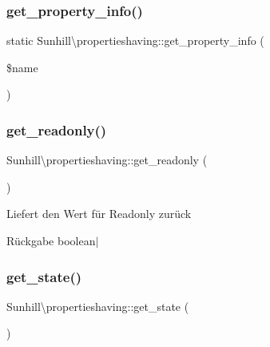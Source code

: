 \subsubsection{\texorpdfstring{get\+\_\+property\+\_\+info()}{get\_property\_info()}}
{\footnotesize\ttfamily static Sunhill\textbackslash{}propertieshaving\+::get\+\_\+property\+\_\+info (\begin{DoxyParamCaption}\item[{}]{\$name }\end{DoxyParamCaption})\hspace{0.3cm}{\ttfamily [static]}}

\mbox{\label{classSunhill_1_1propertieshaving_af24837011f4842790e4c3af28b000893}} 
\subsubsection{\texorpdfstring{get\+\_\+readonly()}{get\_readonly()}}
{\footnotesize\ttfamily Sunhill\textbackslash{}propertieshaving\+::get\+\_\+readonly (\begin{DoxyParamCaption}{ }\end{DoxyParamCaption})\hspace{0.3cm}{\ttfamily [protected]}}

Liefert den Wert für Readonly zurück \begin{DoxyReturn}{Rückgabe}
boolean$\vert$ 
\end{DoxyReturn}
\mbox{\label{classSunhill_1_1propertieshaving_a1fef9c7f754065855f78b3c08a42c20c}} 
\subsubsection{\texorpdfstring{get\+\_\+state()}{get\_state()}}
{\footnotesize\ttfamily Sunhill\textbackslash{}propertieshaving\+::get\+\_\+state (\begin{DoxyParamCaption}{ }\end{DoxyParamCaption})\hspace{0.3cm}{\ttfamily [protected]}}

